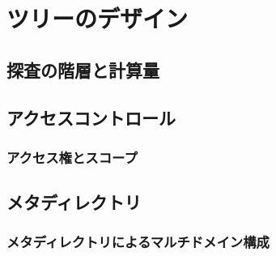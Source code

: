 \chapter{ツリーのデザイン}

\section{探査の階層と計算量}

\section{アクセスコントロール}

\subsection{アクセス権とスコープ}

\section{メタディレクトリ}

\subsection{メタディレクトリによるマルチドメイン構成}